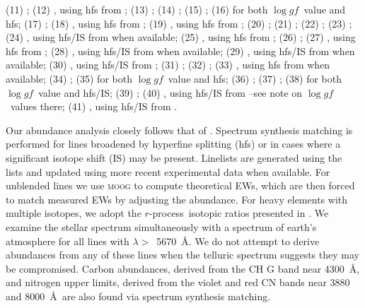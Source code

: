 \documentclass[useAMS,usenatbib,usegraphicx]{mn2e}
\def\rpro{\mbox{$r$-process}}
\def\loggf{$\log gf$}
\begin{document}
\begin{table}
\begin{minipage}{\textwidth}
(11) \citealt{wood13};
(12) \citealt{doerr85a}, using hfs from \citealt{kurucz95};
(13) \citealt{biemont89};
(14) \citealt{sobeck07};
(15) \citealt{nilsson06};
(16) \citealt{denhartog11} for both \loggf\ value and hfs;
(17) \citealt{obrian91};
(18) \citealt{nitz99}, using hfs from \citealt{kurucz95};
(19) \citealt{fuhr09}, using hfs from \citealt{kurucz95};
(20) \citealt{roederer12a};
(21) \citealt{biemont11};
(22) \citealt{ljung06};
(23) \citealt{palmeri05};
(24) \citealt{fuhr09}, using hfs/IS from \citealt{mcwilliam98} when available;
(25) \citealt{lawler01la}, using hfs from \citealt{ivans06};
(26) \citealt{lawler09}; 
(27) \citealt{li07}, using hfs from \citealt{sneden09};
(28) \citealt{denhartog03}, using hfs/IS from \citealt{roederer08} 
        when available;
(29) \citealt{lawler06}, using hfs/IS from \citealt{roederer08} when available;
(30) \citealt{lawler01eu}, using hfs/IS from \citealt{ivans06};
(31) \citealt{denhartog06};
(32) \citealt{roederer12b};
(33) \citealt{lawler01tb}, using hfs from \citealt{lawler01tbhfs} 
        when available;
(34) \citealt{wickliffe00}; 
(35) \citealt{lawler04} for both \loggf\ value and hfs;
(36) \citealt{lawler08};
(37) \citealt{wickliffe97};
(38) \citealt{sneden09} for both \loggf\ value and hfs/IS;
(39) \citealt{lawler07};
(40) \citealt{ivarsson03}, using hfs/IS from \citealt{cowan05}--see
       note on \loggf\ values there;
(41) \citealt{biemont00}, using hfs/IS from \citealt{roederer12b}. \\
\end{minipage}
\end{table}


Our abundance analysis closely follows that
of \citet{roederer14}.
Spectrum synthesis matching is performed for lines broadened by
hyperfine splitting (hfs) or in cases where
a significant isotope shift (IS) may be present.
Linelists are generated using the \citet{kurucz95} lists
and updated using more recent experimental data when available.
For unblended lines we use \textsc{moog} to compute
theoretical EWs, which are then forced to match
measured EWs by adjusting the abundance.
For heavy elements with multiple isotopes,
we adopt the \rpro\ isotopic ratios 
presented in \citet{sneden08}.
We examine the stellar spectrum simultaneously with
a spectrum of earth's atmosphere \citep{hinkle00}
for all lines with $\lambda >$~5670~\AA.
We do not attempt to derive abundances from any of these lines
when the telluric spectrum suggests they may be compromised.
Carbon abundances, derived from the CH G band near 4300~\AA,
and nitrogen upper limits, derived from the violet and red CN bands near
3880 and 8000~\AA\ are also
found via spectrum synthesis matching.
\end{document}
